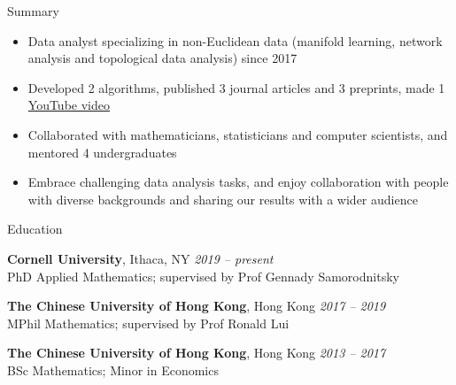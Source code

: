 \documentclass{resume} %
\begin{document}

\begin{rSection}{Summary}

\begin{itemize}
\item Data analyst specializing in non-Euclidean data (manifold learning, network analysis and topological data analysis) since 2017
\item Developed 2 algorithms, published 3 journal articles and 3 preprints, made 1 \href{https://www.youtube.com/watch?v=X5c3_bbwQ7Q}{YouTube video}
\item Collaborated with mathematicians, statisticians and computer scientists, and mentored 4 undergraduates
\item Embrace challenging data analysis tasks, and enjoy collaboration with people with diverse backgrounds and sharing our results with a wider audience
\end{itemize}

\end{rSection}

\begin{rSection}{Education}

{\bf Cornell University}, Ithaca, NY \hfill
{\em 2019 -- present} \\
PhD Applied Mathematics; supervised by Prof Gennady Samorodnitsky

{\bf The Chinese University of Hong Kong}, Hong Kong \hfill
{\em 2017 -- 2019} \\
MPhil Mathematics; supervised by Prof Ronald Lui %

{\bf The Chinese University of Hong Kong}, Hong Kong \hfill
{\em 2013 -- 2017} \\
BSc Mathematics; Minor in Economics %




\end{rSection}
\end{document}
